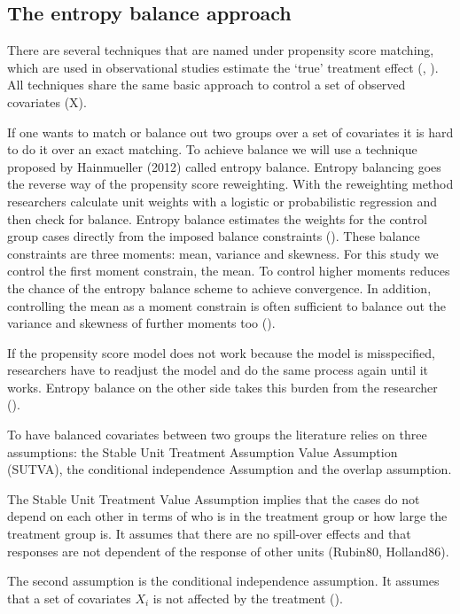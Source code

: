 \subsection{The entropy balance approach}

There are several techniques that are named under propensity score matching, which are used in observational studies estimate the `true' treatment effect (\cite{Antonjietal05}, \cite{Morgan01}). All techniques share the same basic approach to control a set of observed covariates (X).

If one wants to match or balance out two groups over a set of covariates it is hard to do it over an exact matching. To achieve balance we will use a technique proposed by Hainmueller (2012) called entropy balance. Entropy balancing goes the reverse way of the propensity score reweighting. With the reweighting method researchers calculate unit weights with a logistic or probabilistic regression and then check for balance. Entropy balance estimates the weights for the control group cases directly from the imposed balance constraints (\cite{Hainmueller12}). These balance constraints are three moments: mean, variance and skewness. For this study we control the first moment constrain, the mean. To control higher moments reduces the chance of the entropy balance scheme to achieve convergence. In addition, controlling the mean as a moment constrain is often sufficient to balance out the variance and skewness of further moments too (\cite{Hainmuelleretal13}).

If the propensity score model does not work because the model is misspecified, researchers have to readjust the model and do the same process again until it works. Entropy balance on the other side takes this burden from the researcher (\cite{Hainmueller12}).

To have balanced covariates between two groups the literature relies on three assumptions: the Stable Unit Treatment Assumption Value Assumption (SUTVA), the conditional independence Assumption and the overlap assumption.

The Stable Unit Treatment Value Assumption implies that the cases do not depend on each other in terms of who is in the treatment group or how large the treatment group is. It assumes that there are no spill-over effects and that responses are not dependent of the response of other units (Rubin80, Holland86).

The second assumption is the conditional independence assumption. It assumes that a set of covariates \(X_{i}\) is not affected by the treatment (\cite{Caliendoetal08}).

